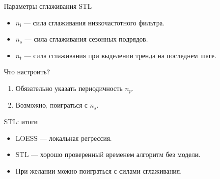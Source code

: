 \begin{frame}{Параметры сглаживания STL}

\begin{itemize}[<+->]
\item $n_l$ — сила сглаживания низкочастотного фильтра. 

\item $n_s$ — сила сглаживания сезонных подрядов.
\item $n_t$ — сила сглаживания при выделении тренда на последнем шаге. 

\end{itemize}

\alert{Что настроить?}
\begin{enumerate}[<+->]
  \item Обязательно указать периодичность $n_p$.
  \item Возможно, поиграться с $n_s$.
\end{enumerate}

\end{frame}

\begin{frame}{STL: итоги}
  \begin{itemize}[<+->]
    \item LOESS — локальная регрессия.
    \item STL — хорошо проверенный временем алгоритм без модели.
    \item При желании можно поиграться с силами сглаживания.
  \end{itemize}

\end{frame}



